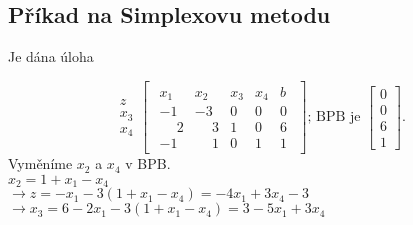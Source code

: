 \subsection{Příkad na Simplexovu metodu}
Je dána úloha

\begin{equation*}
    \begin{array}{c}
        \\
        z \\
        x_3 \\
        x_4 \\
    \end{array}
    \begin{bmatrix}
        \begin{array}{cccc|c}
            x_1 & x_2 & x_3 & x_4 & b \\ \hline
            -1 & -3 & 0 & 0 & 0 \\ \hline
            \phantom{-}2 & \phantom{-}3 & 1 & 0 & 6  \\
            -1 & \phantom{-}1 & 0 & 1 & 1
        \end{array}
    \end{bmatrix}
    \text{; BPB je }
    \begin{bmatrix}
        0 \\
        0 \\
        6 \\
        1
    \end{bmatrix}.
\end{equation*}
Vyměníme $x_2$ a $x_4$ v BPB.\\
$x_2 = 1 + x_1 - x_4$\\
$\rightarrow z = -x_1 - 3(1+x_1-x_4) = -4x_1 + 3x_4 - 3$\\
$\rightarrow x_3 = 6 - 2x_1 - 3(1+x_1-x_4) = 3-5x_1+3x_4$


